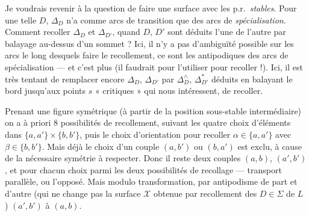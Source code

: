 \documentclass[11pt,a4paper]{article}
\begin{document}
Je voudrais revenir à la question de faire une surface avec les p.r.\ \emph{stables}. Pour une telle $D$, $\Delta_D$ n'a comme arcs de transition que des arcs de \emph{spécialisation}. Comment recoller $\Delta_D$ et $\Delta_{D'}$, quand $D$, $D'$ sont déduits l'une de l'autre par balayage au-dessus d'un sommet ? Ici, il n'y a pas d'ambiguïté possible sur les arcs le long desquels faire le recollement, ce sont les antipodiques des arcs de spécialisation --- et c'est plus  (il faudrait  pour l'utiliser pour recoller !). Ici, il est très tentant de remplacer encore $\Delta_D$, $\Delta_{D'}$ par $\Delta^{\wedge}_D$, $\Delta^{\ast}_{D'}$ déduits en balayant le bord jusqu'aux points $s$ « critiques » qui nous intéressent,   de recoller.

Prenant une figure symétrique (à partir de la position sous-stable intermédiaire) on a à priori $8$ possibilités de recollement, suivant  les quatre choix d'éléments dans $\lbrace a, a' \rbrace \times \lbrace b, b' \rbrace$, puis le choix d'orientation pour recoller $\alpha \in \lbrace a, a' \rbrace$ avec $\beta \in \lbrace b, b' \rbrace$. Mais déjà le choix d'un couple $(a, b')$ ou $(b, a')$ est exclu, à cause de la nécessaire symétrie à respecter. Donc il reste deux couples $(a, b)$, $(a', b')$, et pour chacun choix parmi les deux possibilités de recollage --- transport parallèle, ou l'opposé. Mais modulo  transformation, par antipodisme de part et d'autre (qui ne change pas la surface $\mathcal{X}$ obtenue par recollement \struck{\ill{}} des $D \in \Sigma$  de $L$ ) $(a', b')$  à $(a, b)$.
\end{document}
